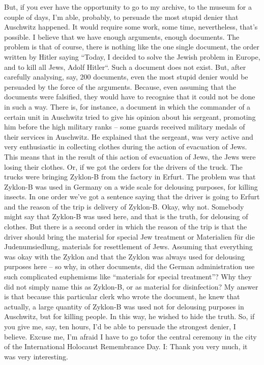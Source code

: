 But, if you ever have the opportunity to go to my archive, to the museum for a couple of days, I’m able, probably, to persuade the most stupid denier that Auschwitz happened. It would require some work, some time, nevertheless, that’s possible. I believe that we have enough arguments, enough documents. The problem is that of course, there is nothing like the one single document, the order written by Hitler saying “Today, I decided to solve the Jewish problem in Europe, and to kill all Jews, Adolf Hitler“. Such a document does not exist. But, after carefully analysing, say, 200 documents, even the most stupid denier would be persuaded by the force of the arguments. Because, even assuming that the documents were falsified, they would have to recognise that it could not be done in such a way. There is, for instance, a document in which the commander of a certain unit in Auschwitz tried to give his opinion about his sergeant, promoting him before the high military ranks – some guards received military medals of their services in Auschwitz. He explained that the sergeant, was very active and very enthusiastic in collecting clothes during the action of evacuation of Jews. This means that in the result of this action of evacuation of Jews, the Jews were losing their clothes. Or, if we got the orders for the drivers of the truck. The trucks were bringing Zyklon-B from the factory in Erfurt. The problem was that Zyklon-B was used in Germany on a wide scale for delousing purposes, for killing insects. In one order we’ve got a sentence saying that the driver is going to Erfurt and the reason of the trip is delivery of Zyklon-B. Okay, why not. Somebody might say that Zyklon-B was used here, and that is the truth, for delousing of clothes. But there is a second order in which the reason of the trip is that the driver should bring the material for special Jew treatment or Materialien für die Judenumsiedlung, materials for resettlement of Jews. Assuming that everything was okay with the Zyklon and that the Zyklon was always used for delousing purposes here – so why, in other documents, did the German administration use such complicated euphemisms like “materials for special treatment”? Why they did not simply name this as Zyklon-B, or as material for disinfection? My answer is that because this particular clerk who wrote the document, he knew that actually, a large quantity of Zyklon-B was used not for delousing purposes in Auschwitz, but for killing people. In this way, he wished to hide the truth. 
So, if you give me, say, ten hours, I’d be able to persuade the strongest denier, I believe. Excuse me, I’m afraid I have to go tofor the central ceremony in the city of the International Holocaust Remembrance Day.
I: Thank you very much, it was very interesting.
